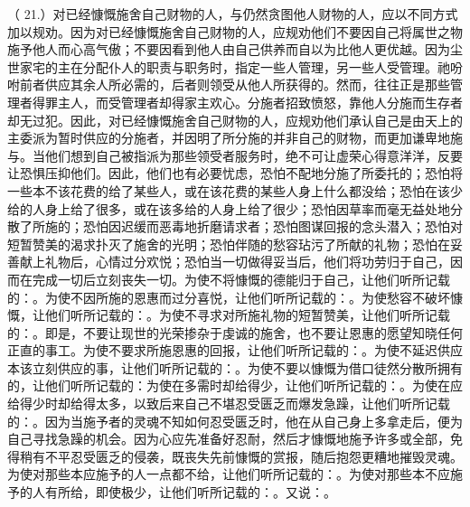 （ 21.）对已经慷慨施舍自己财物的人，与仍然贪图他人财物的人，应以不同方式加以规劝。因为对已经慷慨施舍自己财物的人，应规劝他们不要因自己将属世之物施予他人而心高气傲；不要因看到他人由自己供养而自以为比他人更优越。因为尘世家宅的主在分配仆人的职责与职务时，指定一些人管理，另一些人受管理。祂吩咐前者供应其余人所必需的，后者则领受从他人所获得的。然而，往往正是那些管理者得罪主人，而受管理者却得家主欢心。分施者招致愤怒，靠他人分施而生存者却无过犯。因此，对已经慷慨施舍自己财物的人，应规劝他们承认自己是由天上的主委派为暂时供应的分施者，并因明了所分施的并非自己的财物，而更加谦卑地施与。当他们想到自己被指派为那些领受者服务时，绝不可让虚荣心得意洋洋，反要让恐惧压抑他们。因此，他们也有必要忧虑，恐怕不配地分施了所委托的；恐怕将一些本不该花费的给了某些人，或在该花费的某些人身上什么都没给；恐怕在该少给的人身上给了很多，或在该多给的人身上给了很少；恐怕因草率而毫无益处地分散了所施的；恐怕因迟缓而恶毒地折磨请求者；恐怕图谋回报的念头潜入；恐怕对短暂赞美的渴求扑灭了施舍的光明；恐怕伴随的愁容玷污了所献的礼物；恐怕在妥善献上礼物后，心情过分欢悦；恐怕当一切做得妥当后，他们将功劳归于自己，因而在完成一切后立刻丧失一切。为使不将慷慨的德能归于自己，让他们听所记载的：。为使不因所施的恩惠而过分喜悦，让他们听所记载的：。为使愁容不破坏慷慨，让他们听所记载的：。为使不寻求对所施礼物的短暂赞美，让他们听所记载的：。即是，不要让现世的光荣掺杂于虔诚的施舍，也不要让恩惠的愿望知晓任何正直的事工。为使不要求所施恩惠的回报，让他们听所记载的：。为使不延迟供应本该立刻供应的事，让他们听所记载的：。为使不要以慷慨为借口徒然分散所拥有的，让他们听所记载的：为使在多需时却给得少，让他们听所记载的：。为使在应给得少时却给得太多，以致后来自己不堪忍受匮乏而爆发急躁，让他们听所记载的：。因为当施予者的灵魂不知如何忍受匮乏时，他在从自己身上多拿走后，便为自己寻找急躁的机会。因为心应先准备好忍耐，然后才慷慨地施予许多或全部，免得稍有不平忍受匮乏的侵袭，既丧失先前慷慨的赏报，随后抱怨更糟地摧毁灵魂。为使对那些本应施予的人一点都不给，让他们听所记载的：。为使对那些本不应施予的人有所给，即使极少，让他们听所记载的：。又说：。\par

